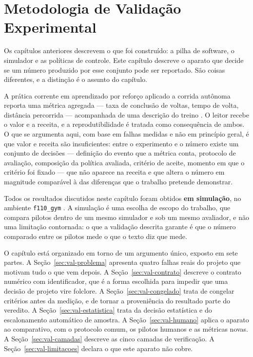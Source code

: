\chapter{Metodologia de Validação Experimental}\label{cap:metodologia}

Os capítulos anteriores descrevem o que foi construído: a pilha de
software, o simulador e as políticas de controle. Este capítulo descreve o
aparato que decide se um número produzido por esse conjunto pode ser reportado.
São coisas diferentes, e a distinção é o assunto do capítulo.

A prática corrente em aprendizado por reforço aplicado a corrida autônoma
reporta uma métrica agregada --- taxa de conclusão de voltas, tempo de volta,
distância percorrida --- acompanhada de uma descrição do treino
\cite{Betz2022Survey}. O leitor recebe o valor e a receita, e a reprodutibilidade
é tratada como consequência de ambos. O que se argumenta aqui, com base em
falhas medidas e não em princípio geral, é que valor e receita são insuficientes:
entre o experimento e o número existe um conjunto de decisões --- definição do
evento que a métrica conta, protocolo de avaliação, composição da política
avaliada, critério de aceite, momento em que o critério foi fixado --- que não
aparece na receita e que altera o número em magnitude comparável à das diferenças
que o trabalho pretende demonstrar.

Todos os resultados discutidos neste capítulo foram obtidos \textbf{em
simulação}, no ambiente \texttt{f110\_gym} \cite{OKelly2020F1TENTH}. A simulação
é uma escolha de escopo do trabalho, que compara pilotos dentro de um mesmo
simulador e sob um mesmo avaliador, e não uma limitação contornada: o que a
validação descrita garante é que o número comparado entre os pilotos mede o que
o texto diz que mede.

O capítulo está organizado em torno de um argumento único, exposto em sete
partes. A Seção~\ref{sec:val-problema} apresenta quatro falhas reais do projeto
que motivam tudo o que vem depois. A Seção~\ref{sec:val-contrato} descreve o contrato
numérico com identificador, que é a forma escolhida para impedir que uma decisão
de projeto vire folclore. A Seção~\ref{sec:val-congelado} trata de congelar
critérios antes da medição, e de tornar a proveniência do resultado parte do
veredito. A Seção~\ref{sec:val-estatistica} trata da decisão estatística e do
escalonamento automático de amostra. A
Seção~\ref{sec:val-humano} aplica o aparato ao comparativo, com o protocolo
comum, os pilotos humanos e as métricas novas. A Seção~\ref{sec:val-camadas}
descreve as cinco camadas de verificação. A
Seção~\ref{sec:val-limitacoes} declara o que este aparato não cobre.

